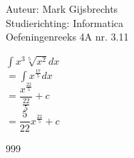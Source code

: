 \documentclass[a4paper]{article}
\newcommand{\dint}{\displaystyle\int}
\begin{document}
\noindent \large Auteur: Mark Gijsbrechts \\
\noindent \large Studierichting: Informatica\\
\noindent \large Oefeningenreeks 4A nr. 3.11\\

\medskip

\normalsize





$ \dint x^3 \sqrt[5]{x^2} dx $ \\

$= \dint x^{\tfrac{17}{5}} dx$ \\

$=  \dfrac{x^{\tfrac{22}{5}}}{\tfrac{22}{5}} + c $ \\
 
$= \dfrac{5}{22} x^{\tfrac{22}{5}} + c $



\begin{thebibliography}{999}
\end{thebibliography}
\end{document}
